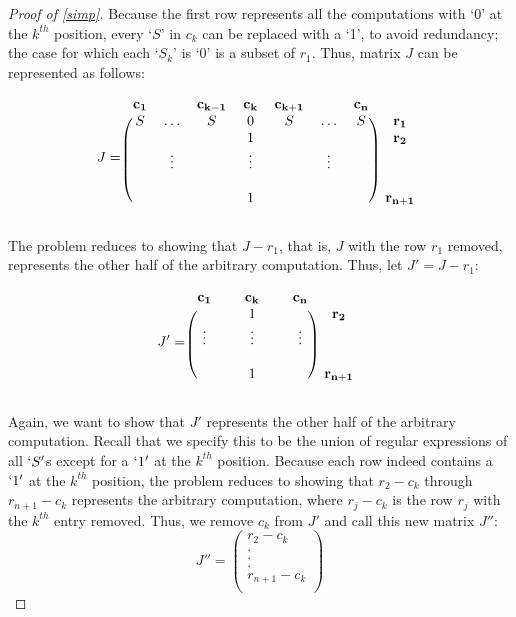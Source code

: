 \documentclass[runningheads]{llncs}
\begin{document}
\begin{proof}[Proof of \ref{simp}]
Because the first row represents all the computations with `0' at the $k^{th}$ position, every `$S$' in $c_k$ can be replaced with a `1', to avoid redundancy; the case for which each `$S_k$' is `0' is a subset of $r_1$. Thus, matrix $J$ can be represented as follows:

\[
J = \begin{blockarray}{cccccccc}
\mathbf{c_1} & & \mathbf{c_{k-1}} & \mathbf{c_k} & \mathbf{c_{k+1}} & & \mathbf{c_n} \\
\begin{block}{(ccccccc)c}
    S & \hdots & S & 0 & S & \hdots & S & \mathbf{r_1}\\
     &  &  & 1 &  &  &  & \mathbf{r_2}\\
    &  \vdots &  & \vdots &  &  \vdots &  & \\
    &  &  &  &  & &  & \\
    & & & 1 & &  & & \mathbf{r_{n+1}}\\
\end{block}
\end{blockarray}
 \]

The problem reduces to showing that $J - r_1$, that is, $J$ with the row $r_1$ removed, represents the other half of the arbitrary computation. Thus, let $J' = J - r_1$:

\[
J' = \begin{blockarray}{cccccc}
\mathbf{c_1} &  & \mathbf{c_k} & & \mathbf{c_n} \\
\begin{block}{(ccccc)c}
     &   & 1 &   &  & \mathbf{r_2}\\
     \vdots & &  \vdots & & \vdots  & \\
    &   &   & &  & \\
    & & 1 &  & & \mathbf{r_{n+1}}\\
\end{block}
\end{blockarray}
 \]

Again, we want to show that $J'$ represents the other half of the arbitrary computation. Recall that we specify this to be the union of regular expressions of all $`S'$s except for a $`1'$ at the $k^{th}$ position. Because each row indeed contains a $`1'$ at the $k^{th}$ position, the problem reduces to showing that $r_2 - c_k$ through $r_{n+1} - c_k$ represents the arbitrary computation, where $r_j - c_k$ is the row $r_j$ with the $k^{th}$ entry removed. Thus, we remove $c_k$ from $J'$ and call this new matrix $J''$:
\[
 J'' = \begin{pmatrix}
    r_2 - c_k \\
    . \\
    . \\
    . \\
    r_{n+1} - c_k \\
    

\end{pmatrix}\]
\end{proof}
\end{document}
